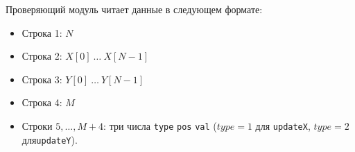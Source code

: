 Проверяющий модуль читает данные в следующем формате:
\begin{itemize}
\item Строка 1: $N$
\item Строка 2: $X[0]\ \ldots\ X[N - 1]$
\item Строка 3: $Y[0]\ \ldots\ Y[N - 1]$
\item Строка 4: $M$
\item Строки $5, \ldots, M + 4$: три числа \texttt{type} \texttt{pos} \texttt{val} ($type=1$ для \texttt{updateX}, $type=2$ для\texttt{updateY}).
\end{itemize}
